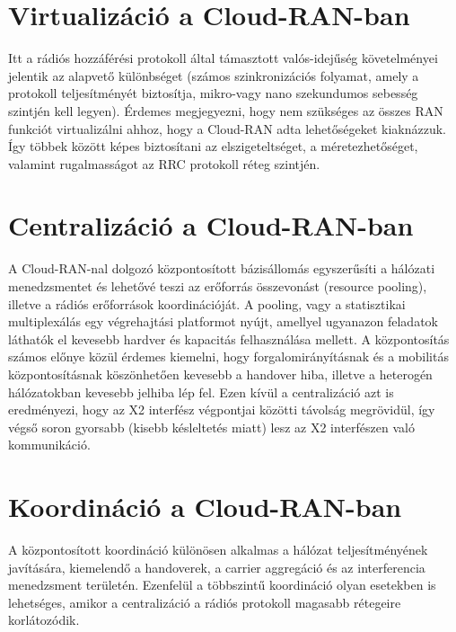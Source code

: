 \section{Virtualizáció a Cloud-RAN-ban}
\hspace{2mm}
\indent Itt a rádiós hozzáférési protokoll által támasztott valós-idejűség követelményei jelentik az alapvető különbséget (számos szinkronizációs folyamat, amely a protokoll teljesítményét biztosítja, mikro-vagy nano szekundumos sebesség szintjén kell legyen). 
Érdemes megjegyezni, hogy nem szükséges az összes RAN funkciót virtualizálni ahhoz, hogy a Cloud-RAN adta lehetőségeket kiaknázzuk. Így többek között képes biztosítani az elszigeteltséget, a méretezhetőséget, valamint rugalmasságot az RRC protokoll réteg szintjén.
\section{Centralizáció a Cloud-RAN-ban}
\hspace{2mm}
\indent A Cloud-RAN-nal dolgozó központosított bázisállomás egyszerűsíti a hálózati menedzsmentet és lehetővé teszi az erőforrás összevonást (resource pooling), illetve a rádiós erőforrások koordinációját. A pooling, vagy a statisztikai multiplexálás egy végrehajtási platformot nyújt, amellyel ugyanazon feladatok láthatók el kevesebb hardver és kapacitás felhasználása mellett. A központosítás számos előnye közül érdemes kiemelni, hogy forgalomirányításnak és a mobilitás központosításnak köszönhetően kevesebb a handover hiba, illetve a heterogén hálózatokban kevesebb jelhiba lép fel. Ezen kívül a centralizáció azt is eredményezi, hogy az X2 interfész végpontjai közötti távolság megrövidül, így végső soron gyorsabb (kisebb késleltetés miatt) lesz az X2 interfészen való kommunikáció.\cite{BenefitsFujitsu}
\section{Koordináció a Cloud-RAN-ban}
\hspace{2mm}
\indent A központosított koordináció különösen alkalmas a hálózat teljesítményének javítására, kiemelendő a handoverek, a carrier aggregáció és az interferencia menedzsment területén. Ezenfelül a többszintű koordináció olyan esetekben is lehetséges, amikor a centralizáció a rádiós protokoll magasabb rétegeire korlátozódik.\cite{BenefitsEricsson}\cite{NokiaSingle}
